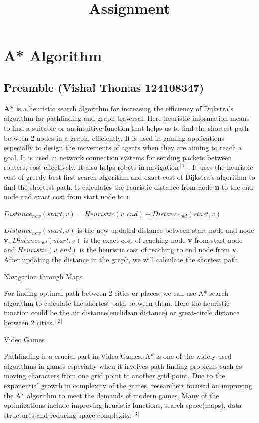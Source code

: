 \documentclass[11pt]{article}
\title{Assignment}
\begin{document}
    
    \maketitle
    
    

    
    \section{A* Algorithm}\label{a-algorithm}

\subsection{Preamble (Vishal Thomas
124108347)}\label{preamble-vishal-thomas-124108347}

\textbf{A*} is a heuristic search algorithm for increasing the
efficiency of Dijkstra's algorithm for pathfinding and graph traversal.
Here heuristic information means to find a suitable or an intuitive
function that helps us to find the shortest path between 2 nodes in a
graph, efficiently. It is used in gaming applications especially to
design the movements of agents when they are aiming to reach a goal. It
is used in network connection systems for sending packets between
routers, cost effectively. It also helps robots in navigation\(^{[1]}\).
It uses the heuristic cost of greedy best first search algorithm and
exact cost of Dijkstra's algorithm to find the shortest path. It
calculates the heuristic distance from node \textbf{n} to the end node
and exact cost from start node to \textbf{n}.

\(Distance_{new}(start,v) = Heuristic(v,end) + Distance_{old}(start,v)\)

\(Distance_{new}(start,v)\) is the new updated distance between start
node and node \textbf{v}, \(Distance_{old}(start,v)\) is the exact cost
of reaching node \textbf{v} from start node and \(Heuristic(v,end)\) is
the heuristic cost of reaching to end node from \textbf{v}. After
updating the distance in the graph, we will calculate the shortest path.

Navigation through Maps

For finding optimal path between 2 cities or places, we can use A*
search algorithm to calculate the shortest path between them. Here the
heuristic function could be the air distance(euclidean distance) or
great-circle distance between 2 cities.\(^{[2]}\)

Video Games

Pathfinding is a crucial part in Video Games. A* is one of the widely
used algorithms in games especially when it involves path-finding
problems such as moving characters from one grid point to another grid
point. Due to the exponential growth in complexity of the games,
researchers focused on improving the A* algorithm to meet the demands of
modern games. Many of the optimizations include improving heuristic
functions, search space(maps), data structures and reducing space
complexity.\(^{[3]}\)
\end{document}
